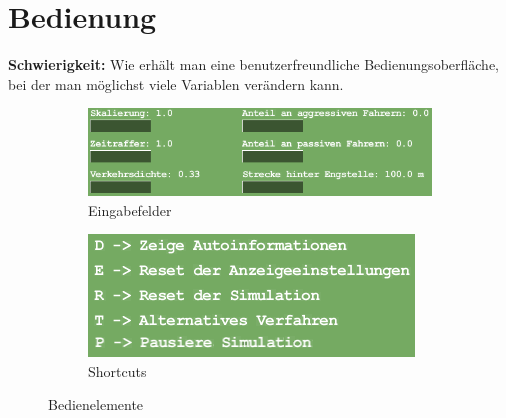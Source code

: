 \section{Bedienung}
\textbf{Schwierigkeit:} Wie erhält man eine benutzerfreundliche Bedienungsoberfläche, bei der man möglichst viele Variablen verändern kann.
\begin{addmargin}[25pt]{0pt}
	\begin{figure}
		\begin{subfigure}{0.55\linewidth}
			\centering
			\includegraphics[width=\linewidth]{images/Eingabe}
			\caption*{Eingabefelder}
			\label{fig:eingabe}
		\end{subfigure}
		\begin{subfigure}{0.37\linewidth}
			\centering
			\includegraphics[width=\linewidth]{images/Bedienung}
			\caption*{Shortcuts}
			\label{fig:shortcuts}
		\end{subfigure}
	\caption{Bedienelemente}
	\label{fig:bedienung}
	\end{figure}
	

\end{addmargin}
